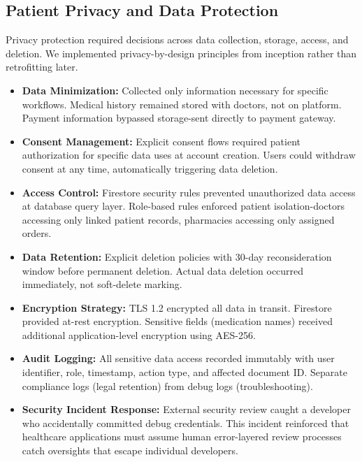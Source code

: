 \documentclass[12pt,a4paper]{report}
\begin{document}
\subsection{Patient Privacy and Data Protection}

Privacy protection required decisions across data collection, storage, access, and deletion. We implemented privacy-by-design principles from inception rather than retrofitting later.

\begin{itemize}
  \item \textbf{Data Minimization:} Collected only information necessary for specific workflows. Medical history remained stored with doctors, not on platform. Payment information bypassed storage-sent directly to payment gateway.

  \item \textbf{Consent Management:} Explicit consent flows required patient authorization for specific data uses at account creation. Users could withdraw consent at any time, automatically triggering data deletion.

  \item \textbf{Access Control:} Firestore security rules prevented unauthorized data access at database query layer. Role-based rules enforced patient isolation-doctors accessing only linked patient records, pharmacies accessing only assigned orders.

  \item \textbf{Data Retention:} Explicit deletion policies with 30-day reconsideration window before permanent deletion. Actual data deletion occurred immediately, not soft-delete marking.

  \item \textbf{Encryption Strategy:} TLS 1.2 encrypted all data in transit. Firestore provided at-rest encryption. Sensitive fields (medication names) received additional application-level encryption using AES-256.

  \item \textbf{Audit Logging:} All sensitive data access recorded immutably with user identifier, role, timestamp, action type, and affected document ID. Separate compliance logs (legal retention) from debug logs (troubleshooting).

  \item \textbf{Security Incident Response:} External security review caught a developer who accidentally committed debug credentials. This incident reinforced that healthcare applications must assume human error-layered review processes catch oversights that escape individual developers.
\end{itemize}
\end{document}
